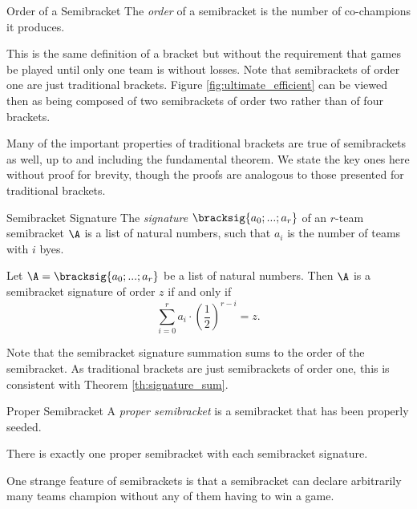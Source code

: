 {    \begin{definition}{Order of a Semibracket}{}
        The \textit{order} of a semibracket is the number of co-champions it produces.
    \end{definition}

    This is the same definition of a bracket but without the requirement that games be played until only one team is without losses. Note that semibrackets of order one are just traditional brackets. Figure \ref{fig:ultimate_efficient} can be viewed then as being composed of two semibrackets of order two rather than of four brackets.
    
    Many of the important properties of traditional brackets are true of semibrackets as well, up to and including the fundamental theorem. We state the key ones here without proof for brevity, though the proofs are analogous to those presented for traditional brackets.

    \begin{definition}{Semibracket Signature}{}
        The \textit{signature} $\bracksig{a_0; ...; a_r}$ of an $r$-team semibracket $\A$ is a list of natural numbers, such that $a_i$ is the number of teams with $i$ byes.
    \end{definition}

    \begin{theorem}{}{}
        Let $\A = \bracksig{a_0; ...; a_r}$ be a list of natural numbers. Then $\A$ is a semibracket signature of order $z$ if and only if $$\sum_{i=0}^r a_i \cdot \left(\frac{1}{2}\right)^{r - i} = z.$$
    \end{theorem}

    Note that the semibracket signature summation sums to the order of the semibracket. As traditional brackets are just semibrackets of order one, this is consistent with Theorem \ref{th:signature_sum}.

    \begin{definition}{Proper Semibracket}{}
        A \textit{proper semibracket} is a semibracket that has been properly seeded.
    \end{definition}

    \begin{theorem}{}{}
        There is exactly one proper semibracket with each semibracket signature.
    \end{theorem}

    One strange feature of semibrackets is that a semibracket can declare arbitrarily many teams champion without any of them having to win a game.

}
